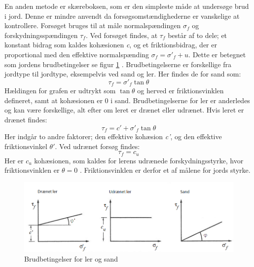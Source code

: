 En anden metode er skæreboksen, som er den simpleste måde at undersøge brud i jord. Denne er mindre anvendt da forsøgsomstændighederne er vanskelige at kontrollere. Forsøget bruges til at måle normalspændingen $\sigma_f$ og forskydningsspændingen $\tau_f$. Ved forsøget findes, at $\tau_f$ består af to dele; et konstant bidrag som kaldes kohæsionen \textit{c}, og et friktionsbidrag, der er proportional med den effektive normalspænding $\sigma_f = \sigma'_f + u$. Dette er betegnet som jordens brudbetingelser se figur \ref{fig:friktionsvinkler} \citep{geoteknik}. 
\newline \indent{     }  Brudbetingelserne er forskellige fra jordtype til jordtype, eksempelvis ved sand og ler. Her findes de for sand som: 
\begin{equation}
\tau_f = \sigma'_f \tan\theta
\end{equation}
Hældingen for grafen er udtrykt som $\tan\theta$ og herved er friktionsvinklen defineret, samt at kohæsionen er 0 i sand. 
\newline \indent{     }  Brudbetingelserne for ler er anderledes og kan være forskellige, alt efter om leret er drænet eller udrænet. Hvis leret er drænet findes: 
\begin{equation}
\tau_f = c' + \sigma'_f \tan\theta
\end{equation}
Her indgår to andre faktorer; den effektive kohæsion \textit{c'}, og den effektive friktionsvinkel $\theta'$. Ved udrænet forsøg findes:
\begin{equation}
	\tau_f=c_u
\end{equation} 
Her er $c_u$ kohæsionen, som kaldes for lerens udrænede forskydningsstyrke, hvor friktionsvinklen er $\theta = 0$ \citep{geoteknik}.  
\newline \indent{     }  Friktionsvinklen er derfor et af målene for jords styrke. 

\begin{figure}[htbp]
	\centering
	\includegraphics[width=1.0\textwidth]{billeder/friktionsvinkeller.png}
	\caption{Brudbetingelser for ler og sand \citep{geoteknik}}
	\label{fig:friktionsvinkler}
\end{figure}


